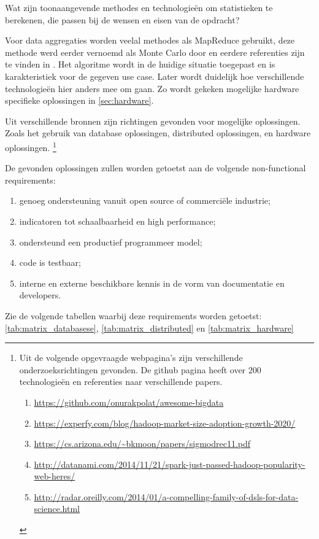 Wat zijn toonaangevende methodes en technologieën om statistieken te berekenen, die passen bij de wensen en eisen van de opdracht?

Voor data aggregaties worden veelal methodes als MapReduce gebruikt, deze methode werd eerder vernoemd als Monte Carlo door \textcite{asanovic2006landscape} en eerdere referenties zijn te vinden in \textcite{lee2010debunking}. Het algoritme wordt in de huidige situatie toegepast en is karakteristiek voor de gegeven use case. Later wordt duidelijk hoe verschillende technologieën hier anders mee om gaan. Zo wordt gekeken mogelijke hardware specifieke oplossingen in \ref{sec:hardware}.


Uit verschillende bronnen zijn richtingen gevonden voor mogelijke oplossingen. Zoals het gebruik van database oplossingen, distributed oplossingen, en hardware oplossingen. \footnote{
Uit de volgende opgevraagde webpagina's zijn verschillende onderzoeksrichtingen gevonden. De github pagina heeft over 200 technologieën en referenties naar verschillende papers.
\begin{enumerate}
    \item \url{https://github.com/onurakpolat/awesome-bigdata}
    \item \url{https://experfy.com/blog/hadoop-market-size-adoption-growth-2020/}
    \item \url{https://cs.arizona.edu/~bkmoon/papers/sigmodrec11.pdf}
    \item \url{http://datanami.com/2014/11/21/spark-just-passed-hadoop-popularity-web-heres/}
    \item \url{http://radar.oreilly.com/2014/01/a-compelling-family-of-dsls-for-data-science.html}
\end{enumerate}
}


De gevonden oplossingen zullen worden getoetst aan de volgende non-functional requirements:
\begin{enumerate}[label=(\alph*)]
   \item genoeg ondersteuning vanuit open source of commerciële industrie;
   \item indicatoren tot schaalbaarheid en high performance;
   \item ondersteund een productief programmeer model;
   \item code is testbaar;
   \item interne en externe beschikbare kennis in de vorm van documentatie en developers.
\end{enumerate}

Zie de volgende tabellen waarbij deze requirements worden getoetst: \ref{tab:matrix_databasese}, \ref{tab:matrix_distributed} en \ref{tab:matrix_hardware}

\begin{comment}
Er zijn een aantal oplossingen gevonden die maximaal gebruik kunnen maken van de performance die moderne hardware te bieden heeft
- clustered databases analytics / datawarehouses (RDBMS): google bigquery, vertica, redshift, hadoopDb, Teradata
- map reduce platform: spark, hadoop, disco etc.
- Hardware, software solutions: Forge en Golang Python, MATLAB, R, Golang, Rust
\end{comment}